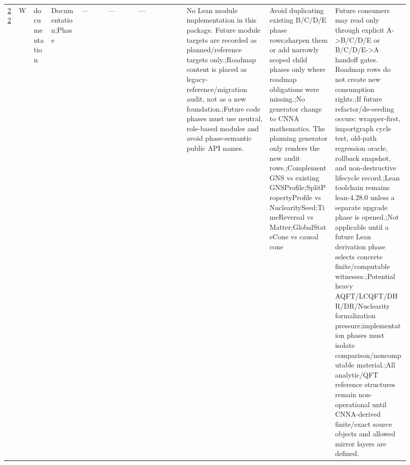 \begin{longtable}{L{0.026\linewidth} L{0.024\linewidth} L{0.045\linewidth} L{0.07\linewidth} L{0.065\linewidth} L{0.075\linewidth} L{0.11\linewidth} L{0.19\linewidth} L{0.155\linewidth} L{0.17\linewidth}}
\hline
\addlinespace[0.24em]
\hyperlink{phase-row-22}{22} & W & documentation & Documentation;\newline Phase & --- & --- & --- & No Lean module implementation in this package. Future module targets are recorded as planned/\allowbreak{}reference targets only.;\newline Roadmap content is placed as legacy-reference/\allowbreak{}migration audit, not as a new foundation.;\newline Future code phases must use neutral, role-based modules and avoid phase-semantic public API names. & Avoid duplicating existing B/\allowbreak{}C/\allowbreak{}D/\allowbreak{}E phase rows;\newline sharpen them or add narrowly scoped child phases only where roadmap obligations were missing.;\newline No generator change to CNNA mathematics. The planning generator only renders the new audit rows.;\newline ComplementGNS vs existing GNSProfile;\newline SplitPropertyProfile vs NuclearitySeed;\newline TimeReversal vs Matter;\newline GlobalStateCone vs causal cone & Future consumers may read only through explicit A->B/\allowbreak{}C/\allowbreak{}D/\allowbreak{}E or B/\allowbreak{}C/\allowbreak{}D/\allowbreak{}E->A handoff gates. Roadmap rows do not create new consumption rights.;\newline If future refactor/\allowbreak{}de-seeding occurs: wrapper-first, importgraph cycle test, old-path regression oracle, rollback snapshot, and non-destructive lifecycle record.;\newline Lean toolchain remains lean-4.28.0 unless a separate upgrade phase is opened.;\newline Not applicable until a future Lean derivation phase selects concrete finite/\allowbreak{}computable witnesses.;\newline Potential heavy AQFT/\allowbreak{}LCQFT/\allowbreak{}DHR/\allowbreak{}DR/\allowbreak{}Nuclearity formalization pressure;\newline implementation phases must isolate comparison/\allowbreak{}noncomputable material.;\newline All analytic/\allowbreak{}QFT reference structures remain non-operational until CNNA-derived finite/\allowbreak{}exact source objects and allowed mirror layers are defined.\\

\end{longtable}
